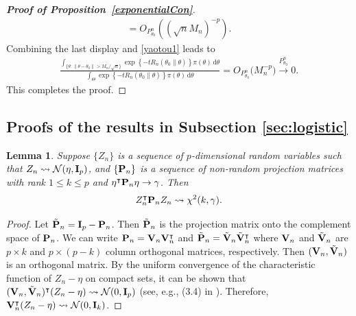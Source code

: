 \documentclass[11pt]{article}
\newcommand{\myT}{\intercal}
\theoremstyle{plain}
\newtheorem{lemma}{\quad\quad Lemma}
\theoremstyle{definition}
\theoremstyle{remark}
\begin{document}
\begin{appendices}
\begin{proof}[\textbf{Proof of Proposition~\ref{exponentialCon}}]
\begin{align*}
=O_{P^n_{\theta_0}}( (\sqrt n M_n)^{-p} ).
\end{align*}
Combining the last display and \eqref{yaotou1} leads to
$$
    \begin{aligned}
        \frac{
\int_{\{\theta:\|\theta-\theta_0\|> M_n/\sqrt{n}\}} \exp\left\{ -t R_n (\theta_0 \| \theta) \right\} \pi(\theta) \, \mathrm d \theta
        }
        {
\int_{\Theta} \exp\left\{ -t R_n (\theta_0 \| \theta) \right\} \pi(\theta) \, \mathrm d \theta
        }
        =
        O_{P_{\theta_0}^n}
        \Big(
            M_n^{-p}
        \Big)
        \xrightarrow{P^n_{\theta_0}} 0.
    \end{aligned}
$$
This completes the proof.

\end{proof}


\subsection{Proofs of the results in Subsection \ref{sec:logistic}}

\begin{lemma}
    \label{lemma:invariance}
    Suppose $\{Z_n\}$ is a sequence of $p$-dimensional random variables such that $Z_n \rightsquigarrow \mathcal N (\eta, \mathbf{I}_p)$, and $\{\mathbf{P}_n\}$ is a sequence of non-random projection matrices with rank $1\leq k \leq p$ and $\eta^\myT \BP_n \eta \to \gamma$.
    Then
    \begin{align*}
        Z_n^\myT \BP_n Z_n \rightsquigarrow \chi^2(k, \gamma).
    \end{align*}
\end{lemma}
\begin{proof}
    Let $\tilde {\mathbf{P}}_n = \mathbf{I}_p - \mathbf{P}_n$.
    Then $\tilde {\mathbf{P}}_n$ is the projection matrix onto the complement space of $\mathbf{P}_n$.
    We can write $\BP_n = \BV_n \BV_n^\myT$ and $\tilde \BP_n = \tilde \BV_n \tilde \BV_n^\myT$ where $\mathbf{V}_n$ and $\tilde {\mathbf{V}}_n$ are $p\times k$ and $p\times (p-k)$ column orthogonal matrices, respectively.
    Then $(\mathbf{V}_n , \tilde {\mathbf{V}}_n)$ is an orthogonal matrix.
    By the uniform convergence of the characteristic function of $Z_n-\eta$ on compact sets, it can be shown that $(\BV_n, \tilde \BV_n)^\myT (Z_n -\eta) \rightsquigarrow \mathcal N (0, \BI_p)$ (see, e.g., (3.4) in \cite{Fahrmeir_1985}).
Therefore, $
    \BV_n^\myT (Z_n-\eta)
    \rightsquigarrow 
    \mathcal N(0, \BI_{k})
    $.


\end{proof}
\end{appendices}
\end{document}
